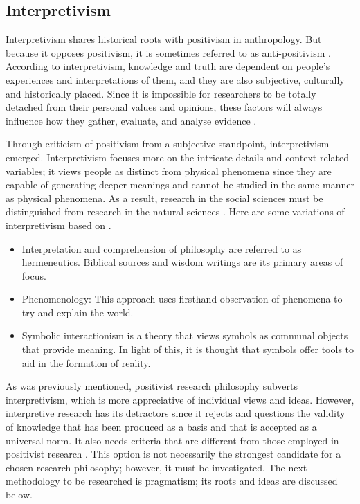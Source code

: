 \subsection{Interpretivism}
\par{Interpretivism shares historical roots with positivism in anthropology. But because it opposes positivism, it is sometimes referred to as anti-positivism \citep{flick2004qualitative}. According to interpretivism, knowledge and truth are dependent on people's experiences and interpretations of them, and they are also subjective, culturally and historically placed. Since it is impossible for researchers to be totally detached from their personal values and opinions, these factors will always influence how they gather, evaluate, and analyse evidence \citep{ryan2018introduction}.}
\par{Through criticism of positivism from a subjective standpoint, interpretivism emerged.}
Interpretivism focuses more on the intricate details and context-related variables; it views people as distinct from physical phenomena since they are capable of generating deeper meanings and cannot be studied in the same manner as physical phenomena. As a result, research in the social sciences must be distinguished from research in the natural sciences \citep{alharahsheh2020review}. Here are some variations of interpretivism based on \cite{littlejohn2009encyclopedia}.
\begin{itemize}
    \item Interpretation and comprehension of philosophy are referred to as hermeneutics. Biblical sources and wisdom writings are its primary areas of focus.
    \item Phenomenology: This approach uses firsthand observation of phenomena to try and explain the world. 
    \item Symbolic interactionism is a theory that views symbols as communal objects that provide meaning. In light of this, it is thought that symbols offer tools to aid in the formation of reality. 
\end{itemize}
\par{As was previously mentioned, positivist research philosophy subverts interpretivism, which is more appreciative of individual views and ideas. However, interpretive research has its detractors since it rejects and questions the validity of knowledge that has been produced as a basis and that is accepted as a universal norm. It also needs criteria that are different from those employed in positivist research \citep{alharahsheh2020review}. This option is not necessarily the strongest candidate for a chosen research philosophy; however, it must be investigated. The next methodology to be researched is pragmatism; its roots and ideas are discussed below.}
